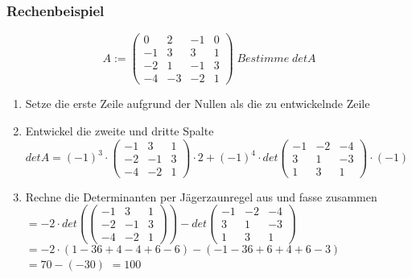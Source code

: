 \subsubsection{Rechenbeispiel} \[A:= \begin{pmatrix}0 & 2 & -1 & 0\\ -1 & 3 & 3 & 1\\ -2 & 1 & -1 & 3\\ -4 & -3 & -2 & 1 \end{pmatrix} \; Bestimme \; detA \]
\begin{enumerate}
    \item Setze die erste Zeile aufgrund der Nullen als die zu entwickelnde Zeile \newline
    \newline
    \item Entwickel die zweite und dritte Spalte \newline
    \newline
    $detA = (-1)^3 \cdot \begin{pmatrix}-1 & 3 & 1\\ -2 & -1 & 3\\ -4 & -2 & 1\end{pmatrix} \cdot 2 + (-1)^4 \cdot det\begin{pmatrix}-1 & -2 & -4\\ 3 & 1 & -3\\ 1 & 3 & 1\end{pmatrix} \cdot (-1)$ \newline
    \newline
    \item Rechne die Determinanten per Jägerzaunregel aus und fasse zusammen \newline
    \newline
    $= -2 \cdot det(\begin{pmatrix}-1 & 3 & 1\\ -2 & -1 & 3\\ -4 & -2 & 1\end{pmatrix}) - det\begin{pmatrix}-1 & -2 & -4\\ 3 & 1 & -3\\ 1 & 3 & 1\end{pmatrix}$ \newline
    \newline
    $= -2 \cdot (1 - 36 + 4 - 4 + 6 - 6) - (-1 - 36 + 6 + 4 + 6 - 3)$ \newline
    \newline
    $= 70 -(-30)$ \newline
    \newline
    $= 100$
    \end{enumerate}

